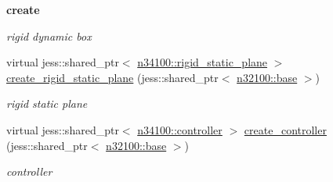 \begin{Indent}{\bf create}
\begin{DoxyCompactItemize}
\begin{DoxyCompactList}\small\item\em rigid dynamic box \item\end{DoxyCompactList}\item 
virtual jess::shared\_\-ptr$<$ \hyperlink{classnebula_1_1content_1_1actor_1_1admin_1_1rigid__static__plane}{n34100::rigid\_\-static\_\-plane} $>$ \hyperlink{classnebula_1_1content_1_1base_a42c450fa53188f3909f010b30f616e17}{create\_\-rigid\_\-static\_\-plane} (jess::shared\_\-ptr$<$ \hyperlink{classnebula_1_1content_1_1scene_1_1admin_1_1base}{n32100::base} $>$)
\begin{DoxyCompactList}\small\item\em rigid static plane \item\end{DoxyCompactList}\item 
virtual jess::shared\_\-ptr$<$ \hyperlink{classnebula_1_1content_1_1actor_1_1admin_1_1controller}{n34100::controller} $>$ \hyperlink{classnebula_1_1content_1_1base_ab2dec7dc05a3e0aaaa2c71ff0f85f79f}{create\_\-controller} (jess::shared\_\-ptr$<$ \hyperlink{classnebula_1_1content_1_1scene_1_1admin_1_1base}{n32100::base} $>$)
\begin{DoxyCompactList}\small\item\em controller \item\end{DoxyCompactList}\end{DoxyCompactItemize}
\end{Indent}
